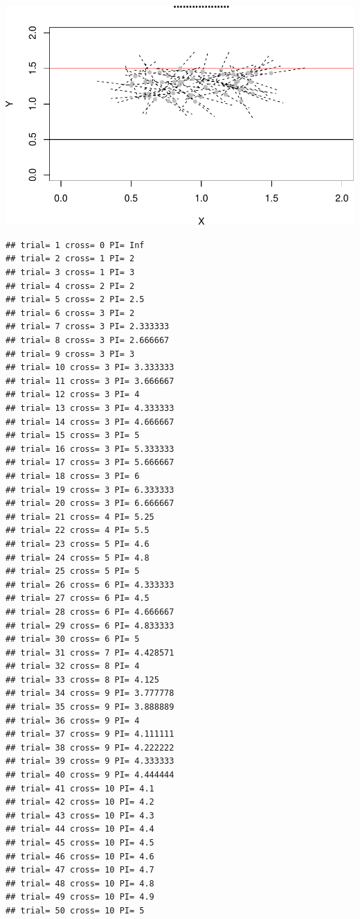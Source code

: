 \documentclass[]{article}
\begin{document}
\includegraphics{probability_files/figure-latex/unnamed-chunk-9-1.pdf}

\begin{verbatim}
## trial= 1 cross= 0 PI= Inf 
## trial= 2 cross= 1 PI= 2 
## trial= 3 cross= 1 PI= 3 
## trial= 4 cross= 2 PI= 2 
## trial= 5 cross= 2 PI= 2.5 
## trial= 6 cross= 3 PI= 2 
## trial= 7 cross= 3 PI= 2.333333 
## trial= 8 cross= 3 PI= 2.666667 
## trial= 9 cross= 3 PI= 3 
## trial= 10 cross= 3 PI= 3.333333 
## trial= 11 cross= 3 PI= 3.666667 
## trial= 12 cross= 3 PI= 4 
## trial= 13 cross= 3 PI= 4.333333 
## trial= 14 cross= 3 PI= 4.666667 
## trial= 15 cross= 3 PI= 5 
## trial= 16 cross= 3 PI= 5.333333 
## trial= 17 cross= 3 PI= 5.666667 
## trial= 18 cross= 3 PI= 6 
## trial= 19 cross= 3 PI= 6.333333 
## trial= 20 cross= 3 PI= 6.666667 
## trial= 21 cross= 4 PI= 5.25 
## trial= 22 cross= 4 PI= 5.5 
## trial= 23 cross= 5 PI= 4.6 
## trial= 24 cross= 5 PI= 4.8 
## trial= 25 cross= 5 PI= 5 
## trial= 26 cross= 6 PI= 4.333333 
## trial= 27 cross= 6 PI= 4.5 
## trial= 28 cross= 6 PI= 4.666667 
## trial= 29 cross= 6 PI= 4.833333 
## trial= 30 cross= 6 PI= 5 
## trial= 31 cross= 7 PI= 4.428571 
## trial= 32 cross= 8 PI= 4 
## trial= 33 cross= 8 PI= 4.125 
## trial= 34 cross= 9 PI= 3.777778 
## trial= 35 cross= 9 PI= 3.888889 
## trial= 36 cross= 9 PI= 4 
## trial= 37 cross= 9 PI= 4.111111 
## trial= 38 cross= 9 PI= 4.222222 
## trial= 39 cross= 9 PI= 4.333333 
## trial= 40 cross= 9 PI= 4.444444 
## trial= 41 cross= 10 PI= 4.1 
## trial= 42 cross= 10 PI= 4.2 
## trial= 43 cross= 10 PI= 4.3 
## trial= 44 cross= 10 PI= 4.4 
## trial= 45 cross= 10 PI= 4.5 
## trial= 46 cross= 10 PI= 4.6 
## trial= 47 cross= 10 PI= 4.7 
## trial= 48 cross= 10 PI= 4.8 
## trial= 49 cross= 10 PI= 4.9 
## trial= 50 cross= 10 PI= 5
\end{verbatim}
\end{document}
